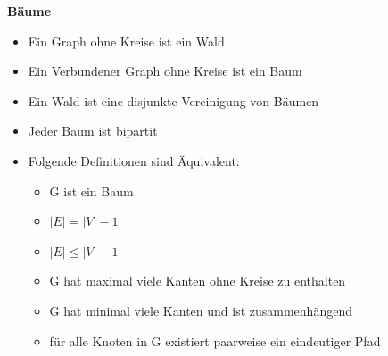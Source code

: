 \documentclass[12pt,a4paper]{article}
\begin{document}
\textbf{Bäume}
\begin{itemize}
\item Ein Graph ohne Kreise ist ein Wald
\item Ein Verbundener Graph ohne Kreise ist ein Baum
\item Ein Wald ist eine disjunkte Vereinigung von Bäumen
\item Jeder Baum ist bipartit
\item Folgende Definitionen sind Äquivalent:
\begin{itemize}
\item G ist ein Baum
\item $\vert E \vert = \vert V \vert -1$
\item $\vert E \vert \leq \vert V \vert -1 $
\item G hat maximal viele Kanten ohne Kreise zu enthalten
\item G hat minimal viele Kanten und ist zusammenhängend
\item für alle Knoten in G existiert paarweise ein eindeutiger Pfad
\end{itemize}
\end{itemize}
\end{document}

